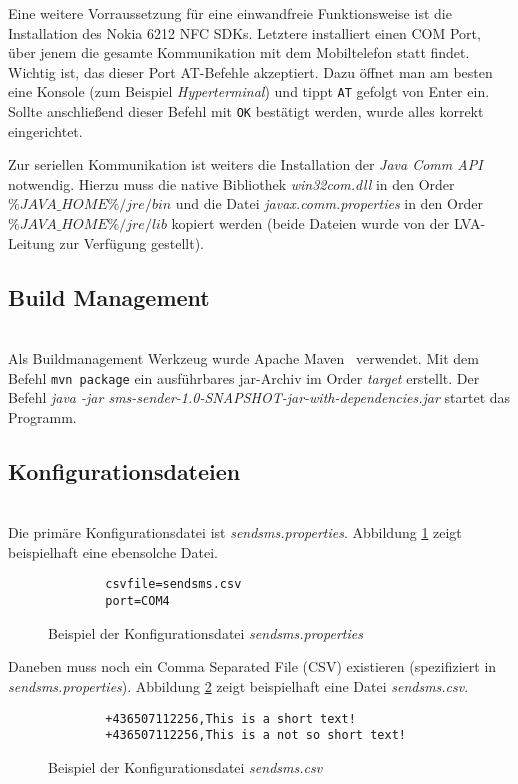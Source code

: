 \documentclass[paper=a4, fontsize=11pt]{scrartcl}
\begin{document}
Eine weitere Vorraussetzung für eine einwandfreie
Funktionsweise ist die Installation des Nokia 6212 NFC SDKs. Letztere installiert einen COM Port, über jenem die gesamte
Kommunikation mit dem Mobiltelefon statt findet. Wichtig ist, das dieser Port AT-Befehle akzeptiert. 
Dazu öffnet man am besten eine Konsole (zum Beispiel \textit{Hyperterminal}) und tippt \texttt{AT} gefolgt von Enter ein. 
Sollte anschließend dieser Befehl mit \texttt{OK} bestätigt werden, wurde alles korrekt eingerichtet. 

Zur seriellen Kommunikation ist weiters die Installation der \textit{Java Comm API} notwendig. Hierzu muss die native Bibliothek \textit{win32com.dll} in den Order $\%JAVA\_HOME\%/jre/bin$ und die Datei \textit{javax.comm.properties} in den Order $\%JAVA\_HOME\%/jre/lib$ kopiert werden (beide Dateien wurde von der LVA-Leitung zur Verfügung gestellt).

\subsection{Build Management}~\\
Als Buildmanagement Werkzeug wurde Apache Maven~\cite{maven} verwendet. Mit dem Befehl \texttt{mvn package} ein
ausführbares jar-Archiv im Order \textit{target} erstellt. Der Befehl \textit{java -jar sms-sender-1.0-SNAPSHOT-jar-with-dependencies.jar}
startet das Programm. 

\subsection{Konfigurationsdateien}~\\
Die primäre Konfigurationsdatei ist \textit{sendsms.properties}.
Abbildung \ref{fig:sms-prop} zeigt beispielhaft eine ebensolche Datei.\\ 

\begin{figure}[H]
	\begin{verbatim}
		csvfile=sendsms.csv
		port=COM4
	\end{verbatim}
	\caption{Beispiel der Konfigurationsdatei \textit{sendsms.properties}}
	\label{fig:sms-prop}
\end{figure}

Daneben muss noch ein Comma Separated File (CSV) existieren (spezifiziert in \textit{sendsms.properties}). 
Abbildung \ref{fig:sms-csv} zeigt beispielhaft eine Datei \textit{sendsms.csv}.\\
 \begin{figure}[H]
 	\begin{verbatim}
		+436507112256,This is a short text!
		+436507112256,This is a not so short text!
 	\end{verbatim}
 	\caption{Beispiel der Konfigurationsdatei \textit{sendsms.csv}}
 	\label{fig:sms-csv}
 \end{figure}
 
\newpage


\end{document}
